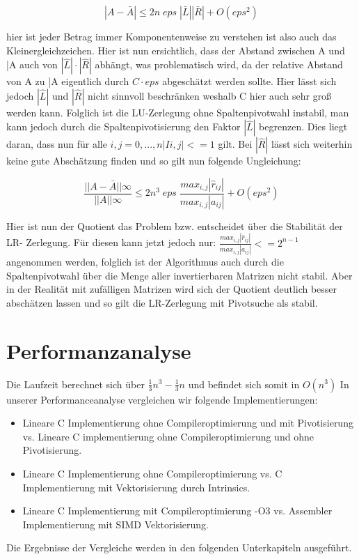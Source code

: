 \documentclass[course=erap]{aspdoc}
\begin{document}
 \begin{equation}
\label{eg3}
|A - \bar{A}| \leq 2n \; eps \; |\bar{L}||\bar{R}| + O(eps^2)
\end{equation}

hier ist jeder Betrag immer Komponentenweise zu verstehen ist also auch das Kleinergleichzeichen.										%
Hier ist nun ersichtlich, dass der Abstand zwischen A und \bar{A} auch von $|\hat{L}| \cdot |\hat{R}|$
abhängt, was problematisch wird, da der relative Abstand von A zu \bar{A} eigentlich durch 
$C\cdot eps$ abgeschätzt werden sollte. Hier lässt sich jedoch $|\hat{L}|$ und $|\hat{R}|$ nicht sinnvoll 
beschränken weshalb C hier auch sehr groß werden kann.
Folglich ist die LU-Zerlegung ohne Spaltenpivotwahl instabil, man kann jedoch durch die Spaltenpivotisierung 
den Faktor $|\hat{L}|$  begrenzen. Dies liegt daran, dass nun für alle $i,j = 0,...,n |Ii,j| <= 1$ gilt. 
Bei $|\hat{R}|$ lässt sich weiterhin keine gute Abschätzung finden und so gilt nun folgende Ungleichung:  

 \begin{equation}
\label{eg3}
\frac{||A - \bar{A}||\infty}{||A||\infty} \leq 2n^3 \; eps \;\frac{max_{i,j}| \hat{r}_{ij}|}{max_{i,j}|a_{ij}|} + O(eps^2)
\end{equation}


Hier ist nun der Quotient das Problem bzw. entscheidet über die Stabilität der LR-
Zerlegung. Für diesen kann jetzt jedoch nur: $\frac{max_{i,j}| \hat{r}_{ij}|}{max_{i,j}|a_{ij}|} <= 2^{n-1}$ angenommen 
werden, folglich ist der Algorithmus auch durch die Spaltenpivotwahl über die Menge 
aller invertierbaren Matrizen nicht stabil. Aber in der Realität mit zufälligen Matrizen wird 
sich der Quotient deutlich besser abschätzen lassen und so gilt die LR-Zerlegung mit Pivotsuche als stabil.


\section{Performanzanalyse}
\label{Performanzanalyse}
Die Laufzeit berechnet sich über  $ \frac{1}{3}n^3 -\frac{1}{3} n $ und befindet sich somit in $O(n^3)$ \cite{LULaufzeit}
In unserer Performanceanalyse vergleichen wir folgende Implementierungen:\\
\begin{itemize}
\item Lineare C Implementierung ohne Compileroptimierung und mit Pivotisierung vs. Lineare C implementierung ohne Compileroptimierung und ohne Pivotisierung. 
\item Lineare C Implementierung ohne Compileroptimierung vs. C Implementierung mit Vektorisierung durch Intrinsics. 
\item Lineare C Implementierung mit Compileroptimierung -O3 vs. Assembler Implementierung mit SIMD Vektorisierung.
\end{itemize}
Die Ergebnisse der Vergleiche werden in den folgenden Unterkapiteln ausgeführt. \\
\end{document}
